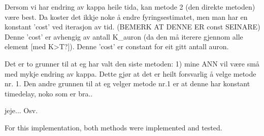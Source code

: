	Dersom vi har endring av kappa heile tida, kan metode 2 (den direkte metoden) være best.
	Da koster det ikkje noke å endre fyringsestimatet, men man har en konstant 'cost' ved iterasjon av tid. (BEMERK AT DENNE ER const SEINARE)
	Denne 'cost' er avhengig av antall K\_auron (da den må iterere gjennom alle element [med K>T?]). Denne 'cost' er constant for eit gitt antall auron.

	Det er to grunner til at eg har valt den siste metoden: 1) mine ANN vil være små med mykje endring av kappa. Dette gjør at det er heilt forsvarlig å velge metode nr. 1.
	Den andre grunnen til at eg velger metode nr.1 er at denne har konstant timedelay, noko som er bra..

	jeje... Osv.

	For this implementation, both methods were implemented and tested. 



















